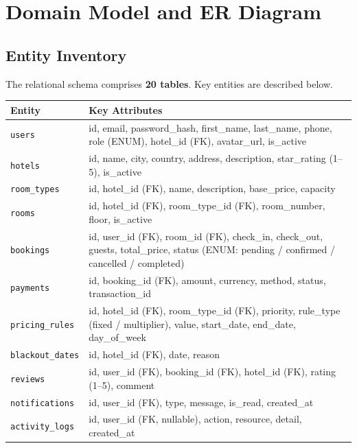 \documentclass[12pt,a4paper]{article}
\begin{document}
\section{Domain Model and ER Diagram}

\subsection{Entity Inventory}

The relational schema comprises \textbf{20 tables}. Key entities are described below.

\begin{table}[H]
\centering\small
\begin{tabularx}{\linewidth}{lX}
\toprule
\textbf{Entity} & \textbf{Key Attributes} \\
\midrule
\texttt{users}        & id, email, password\_hash, first\_name, last\_name, phone, role (ENUM), hotel\_id (FK), avatar\_url, is\_active \\
\texttt{hotels}       & id, name, city, country, address, description, star\_rating (1--5), is\_active \\
\texttt{room\_types}  & id, hotel\_id (FK), name, description, base\_price, capacity \\
\texttt{rooms}        & id, hotel\_id (FK), room\_type\_id (FK), room\_number, floor, is\_active \\
\texttt{bookings}     & id, user\_id (FK), room\_id (FK), check\_in, check\_out, guests, total\_price, status (ENUM: pending / confirmed / cancelled / completed) \\
\texttt{payments}     & id, booking\_id (FK), amount, currency, method, status, transaction\_id \\
\texttt{pricing\_rules} & id, hotel\_id (FK), room\_type\_id (FK), priority, rule\_type (fixed / multiplier), value, start\_date, end\_date, day\_of\_week \\
\texttt{blackout\_dates} & id, hotel\_id (FK), date, reason \\
\texttt{reviews}      & id, user\_id (FK), booking\_id (FK), hotel\_id (FK), rating (1--5), comment \\
\texttt{notifications} & id, user\_id (FK), type, message, is\_read, created\_at \\
\texttt{activity\_logs} & id, user\_id (FK, nullable), action, resource, detail, created\_at \\

\end{tabularx}
\end{table}
\end{document}
